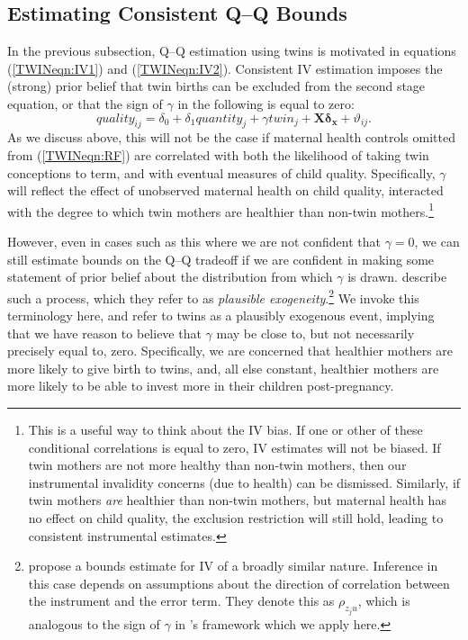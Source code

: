 \documentclass[subeqn]{article}
\begin{document}
\begin{spacing}{1.4}
\subsection{Estimating Consistent Q--Q Bounds}
\label{TWINscn:gamma}
In the previous subsection, Q--Q estimation using twins is motivated in equations
(\ref{TWINeqn:IV1}) and (\ref{TWINeqn:IV2}).  Consistent IV estimation imposes
the (strong) prior belief that twin births can be excluded from the second stage
equation, or that the sign of $\gamma$ in the following is equal to zero:
\begin{equation}
  \label{TWINeqn:Conley}
  quality_{ij}=\delta_0 + \delta_1 quantity_j + \gamma twin_j + \bm{X}\bm{\delta_x} + \vartheta_{ij}.
\end{equation}
As we discuss above, this will not be the case if maternal health controls
omitted from (\ref{TWINeqn:RF}) are correlated with both the likelihood of
taking twin conceptions to term, and with eventual measures of child quality.
Specifically, $\gamma$ will reflect the effect of unobserved maternal health
on child quality, interacted with the degree to which twin mothers are healthier
than non-twin mothers.\footnote{This is a useful way to think about the IV bias.
  If one or other of these conditional correlations is equal to zero, IV estimates
  will not be biased.  If twin mothers are not more healthy than non-twin mothers,
  then our instrumental invalidity concerns (due to health) can be dismissed.
  Similarly, if twin mothers \emph{are} healthier than non-twin mothers, but
  maternal health has no effect on child quality, the exclusion restriction will
  still hold, leading to consistent instrumental estimates.}

However, even in cases such as this where we are not confident that $\gamma=0$,
we can still estimate bounds on the Q--Q tradeoff if we are confident in making
some statement of prior belief about the distribution from which $\gamma$ is
drawn.  \citet{Conleyetal2012} describe such a process, which they refer to as
\emph{plausible exogeneity}.\footnote{\citet{NevoRosen2012} propose a bounds
  estimate for IV of a broadly similar nature.  Inference in this case depends on
  assumptions about the direction of correlation between the instrument and the
  error term. They denote this as $\rho_{z_{j}u}$, which is analogous to the sign
  of $\gamma$ in \citeauthor{Conleyetal2012}'s framework which we apply here.} We
invoke this terminology here, and refer to twins as a plausibly exogenous event,
implying that we have reason to believe that $\gamma$ may be close to, but not
necessarily precisely equal to, zero. Specifically, we are concerned that
healthier mothers are more likely to give birth to twins, and, all else
constant, healthier mothers are more likely to be able to invest more in their
children post-pregnancy.


\end{spacing}
\end{document}
